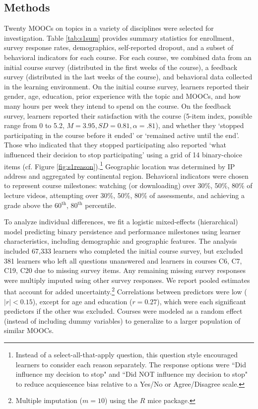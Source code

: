 \documentclass{sigchi}\usepackage[]{graphicx}\usepackage[]{color}
\begin{document}
\subsection{Methods}

Twenty MOOCs on topics in a variety of disciplines were selected for investigation. Table \ref{tab:s1sum} provides summary statistics for enrollment, survey response rates, demographics, self-reported dropout, and a subset of behavioral indicators for each course. For each course, we combined data from an initial course survey (distributed in the first weeks of the course), a feedback survey (distributed in the last weeks of the course), and behavioral data collected in the learning environment. On the initial course survey, learners reported their gender, age, education, prior experience with the topic and MOOCs, and how many hours per week they intend to spend on the course. On the feedback survey, learners reported their satisfaction with the course (5-item index, possible range from 0 to 5.2, $M=3.95, SD=0.81, \alpha=.81$), and whether they `stopped participating in the course before it ended' or `remained active until the end'. Those who indicated that they stopped participating also reported `what influenced their decision to stop participating' using a grid of 14 binary-choice items (cf. Figure \ref{fig:s1reason}).\footnote{Instead of a select-all-that-apply question, this question style encouraged learners to consider each reason separately. The response options were ``Did influence my decision to stop" and ``Did NOT influence my decision to stop" to reduce acquiescence bias relative to a Yes/No or Agree/Disagree scale.} Geographic location was determined by IP address and aggregated by continental region. Behavioral indicators were chosen to represent course milestones: watching (or downloading) over 30\%, 50\%, 80\% of lecture videos, attempting over 30\%, 50\%, 80\% of assessments, and achieving a grade above the 60$^\text{th}$, 80$^\text{th}$ percentile. 

To analyze individual differences, we fit a logistic mixed-effects (hierarchical) model predicting binary persistence and performance milestones using learner characteristics, including demographic and geographic features. The analysis included 67,333 learners who completed the initial course survey, but excluded 381 learners who left all questions unanswered and learners in courses C6, C7, C19, C20 due to missing survey items. Any remaining missing survey responses were multiply imputed using other survey responses. We report pooled estimates that account for added uncertainty.\footnote{Multiple imputation ($m=10$) using the $R$ mice package.} Correlations between predictors were low ($|r|<0.15$), except for age and education ($r=0.27$), which were each significant predictors if the other was excluded. Courses were modeled as a random effect (instead of including dummy variables) to generalize to a larger population of similar MOOCs.
\end{document}
